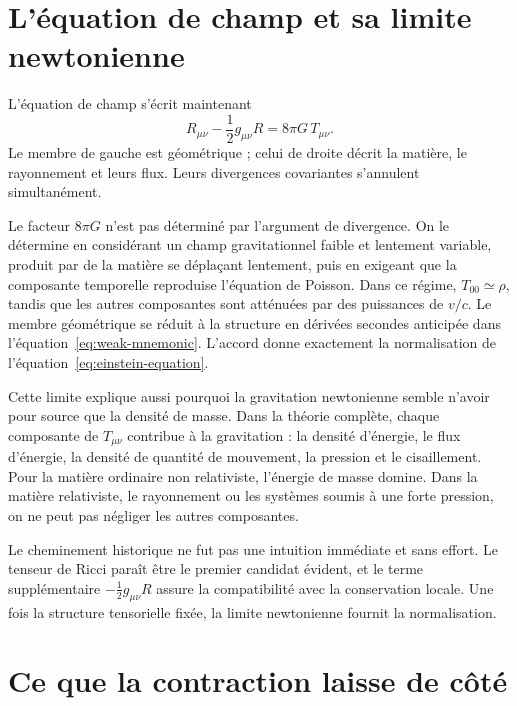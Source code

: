 \section{L’équation de champ et sa limite newtonienne}

L’équation de champ s’écrit maintenant
\begin{equation}
 \boxed{
 R_{\mu\nu}-\frac12 g_{\mu\nu}R
 =
 8\pi G\,T_{\mu\nu}
 }.
 \label{eq:einstein-equation}
\end{equation}
Le membre de gauche est géométrique ; celui de droite décrit la matière, le rayonnement et leurs flux. Leurs divergences covariantes s’annulent simultanément.

Le facteur \(8\pi G\) n’est pas déterminé par l’argument de divergence. On le détermine en considérant un champ gravitationnel faible et lentement variable, produit par de la matière se déplaçant lentement, puis en exigeant que la composante temporelle reproduise l’équation de Poisson. Dans ce régime, \(T_{00}\simeq\rho\), tandis que les autres composantes sont atténuées par des puissances de \(v/c\). Le membre géométrique se réduit à la structure en dérivées secondes anticipée dans l’équation~\eqref{eq:weak-mnemonic}. L’accord donne exactement la normalisation de l’équation~\eqref{eq:einstein-equation}.

Cette limite explique aussi pourquoi la gravitation newtonienne semble n’avoir pour source que la densité de masse. Dans la théorie complète, chaque composante de \(T_{\mu\nu}\) contribue à la gravitation : la densité d’énergie, le flux d’énergie, la densité de quantité de mouvement, la pression et le cisaillement. Pour la matière ordinaire non relativiste, l’énergie de masse domine. Dans la matière relativiste, le rayonnement ou les systèmes soumis à une forte pression, on ne peut pas négliger les autres composantes.

Le cheminement historique ne fut pas une intuition immédiate et sans effort. Le tenseur de Ricci paraît être le premier candidat évident, et le terme supplémentaire \(-\tfrac12g_{\mu\nu}R\) assure la compatibilité avec la conservation locale. Une fois la structure tensorielle fixée, la limite newtonienne fournit la normalisation.

\section{Ce que la contraction laisse de côté}

\begin{classroomqa}
\end{classroomqa}

